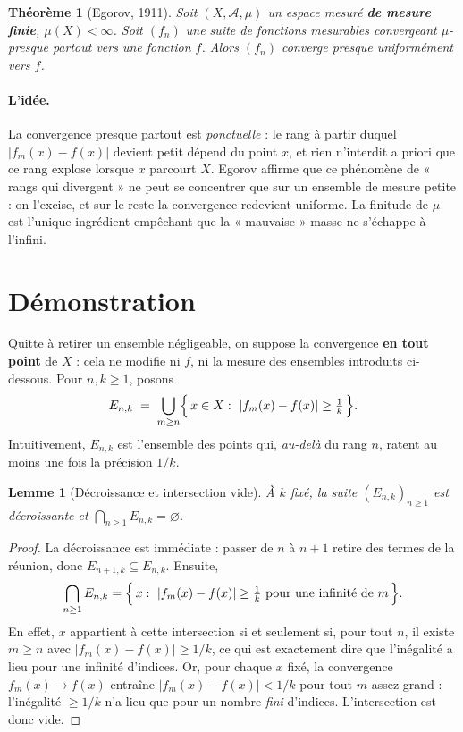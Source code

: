 \documentclass[11pt,a4paper]{article}
\theoremstyle{plain}
\newtheorem{theoreme}{Théorème}
\newtheorem{lemme}{Lemme}
\theoremstyle{definition}
\newcommand{\A}{\mathcal{A}}
\newcommand{\1}{\mathbf{1}}
\newcommand{\abs}[1]{\left|#1\right|}
\begin{document}
\begin{theoreme}[Egorov, 1911]\label{th:egorov}
Soit $(X,\A,\mu)$ un espace mesuré \textbf{de mesure finie}, $\mu(X)<\infty$.
Soit $(f_n)$ une suite de fonctions mesurables convergeant $\mu$-presque partout
vers une fonction $f$. Alors $(f_n)$ converge presque uniformément vers $f$.
\end{theoreme}

\paragraph{L'idée.} La convergence presque partout est \emph{ponctuelle} : le rang
à partir duquel $\abs{f_m(x)-f(x)}$ devient petit dépend du point $x$, et rien
n'interdit a priori que ce rang explose lorsque $x$ parcourt $X$. Egorov affirme
que ce phénomène de « rangs qui divergent » ne peut se concentrer que sur un
ensemble de mesure petite : on l'excise, et sur le reste la convergence redevient
uniforme. La finitude de $\mu$ est l'unique ingrédient empêchant que la
« mauvaise » masse ne s'échappe à l'infini.

\section{Démonstration}\label{sec:preuve-egorov}

Quitte à retirer un ensemble négligeable, on suppose la convergence \textbf{en tout
point} de $X$ : cela ne modifie ni $f$, ni la mesure des ensembles introduits
ci-dessous. Pour $n,k\ge 1$, posons
\[
  E_{n,k}\;=\;\bigcup_{m\ge n}\Bigl\{\,x\in X:\ \abs{f_m(x)-f(x)}\ge\tfrac1k\,\Bigr\}.
\]
Intuitivement, $E_{n,k}$ est l'ensemble des points qui, \emph{au-delà} du rang $n$,
ratent au moins une fois la précision $1/k$.

\begin{lemme}[Décroissance et intersection vide]\label{lem:decr}
À $k$ fixé, la suite $(E_{n,k})_{n\ge1}$ est décroissante et
$\displaystyle\bigcap_{n\ge1}E_{n,k}=\varnothing$.
\end{lemme}

\begin{proof}
La décroissance est immédiate : passer de $n$ à $n+1$ retire des termes de la
réunion, donc $E_{n+1,k}\subseteq E_{n,k}$. Ensuite,
\[
  \bigcap_{n\ge1}E_{n,k}
  =\Bigl\{\,x:\ \abs{f_m(x)-f(x)}\ge\tfrac1k\ \text{pour une infinité de }m\,\Bigr\}.
\]
En effet, $x$ appartient à cette intersection si et seulement si, pour tout $n$,
il existe $m\ge n$ avec $\abs{f_m(x)-f(x)}\ge 1/k$, ce qui est exactement dire que
l'inégalité a lieu pour une infinité d'indices. Or, pour chaque $x$ fixé, la
convergence $f_m(x)\to f(x)$ entraîne $\abs{f_m(x)-f(x)}<1/k$ pour tout $m$ assez
grand : l'inégalité $\ge 1/k$ n'a lieu que pour un nombre \emph{fini} d'indices.
L'intersection est donc vide.
\end{proof}
\end{document}
